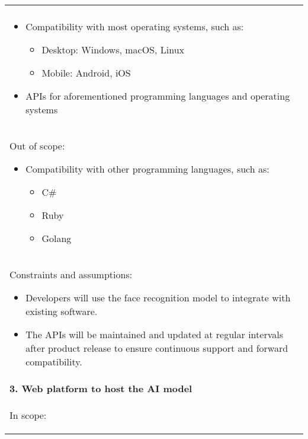 \begin{longtable}{ | p{} l | }
{\begin{itemize}
\begin{itemize}
                \end{itemize}
        \end{itemize}
    } \\
    \multicolumn{2}{|p{\textwidth}|}{
        \begin{itemize}
            \item Compatibility with most operating systems, such as:
                \begin{itemize}
                    \item Desktop: Windows, macOS, Linux
                    \item Mobile: Android, iOS
                \end{itemize}
            \item APIs for aforementioned programming languages and operating systems
        \end{itemize}
    } \\
    \multicolumn{2}{|p{\textwidth}|}{\hspace{0.6cm}Out of scope:
        \begin{itemize}
            \item Compatibility with other programming languages, such as:
                \begin{itemize}
                    \item C\#
                    \item Ruby
                    \item Golang
                \end{itemize}
        \end{itemize}
    } \\
    \multicolumn{2}{|p{\textwidth}|}{\hspace{0.6cm}Constraints and assumptions:
        \begin{itemize}
            \item Developers will use the face recognition model to integrate with existing software.
            \item The APIs will be maintained and updated at regular intervals after product release to ensure continuous support and forward compatibility.
        \end{itemize}
    } \\
    \multicolumn{2}{|p{\textwidth}|}{\textbf{3. Web platform to host the AI model}} \\
    \multicolumn{2}{|p{\textwidth}|}{\hspace{0.6cm}In scope:
        \begin{itemize}

\end{itemize}}
\end{longtable}

